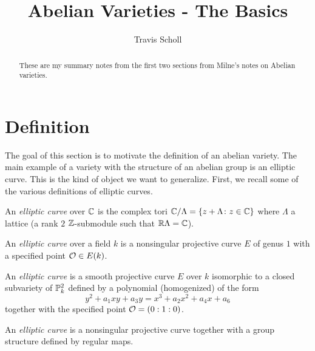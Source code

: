 \documentclass[11pt]{article}
\newcommand{\mytitle}{Abelian Varieties - The Basics}
\newcommand{\myauthor}{Travis Scholl}
\begin{document}
\title{\mytitle}
\author{\sc \myauthor }
\maketitle

\begin{abstract}
	These are my summary notes from the first two sections from Milne's notes \cite{milneAV} on Abelian varieties.
\end{abstract}

\section{Definition}

The goal of this section is to motivate the definition of an abelian variety. The main example of a variety with the structure of an abelian group is an elliptic curve. This is the kind of object we want to generalize. First, we recall some of the various definitions of elliptic curves.

\begin{defn}\label{def:ec_tori}
	An \emph{elliptic curve} over $\mathbb{C}$ is the complex tori $\mathbb{C}/\Lambda = \{z+\Lambda \colon z\in\mathbb{C}\}$ where $\Lambda$ a lattice (a rank $2$ $\mathbb{Z}$-submodule such that $\mathbb{R}\Lambda = \mathbb{C}$).
\end{defn}

\begin{defn}\label{def:ec_genus}
	An \emph{elliptic curve} over a field $k$ is a nonsingular projective curve $E$ of genus $1$ with a specified point $\mathcal{O}\in E(k)$.
\end{defn}

\begin{defn}\label{def:ec_weirstras}
	An \emph{elliptic curve} is a smooth projective curve $E$ over $k$ isomorphic to a closed subvariety of $\mathbb{P}_k^2$ defined by a polynomial (homogenized) of the form
	$$
	y^2 + a_1xy + a_3y = x^3 + a_2x^2 + a_4x + a_6
	$$
	together with the specified point $\mathcal{O} = (0:1:0)$.
\end{defn}

\begin{defn}\label{def:ec_gp}
	An \emph{elliptic curve} is a nonsingular projective curve together with a group structure defined by regular maps.
\end{defn}
\end{document}
